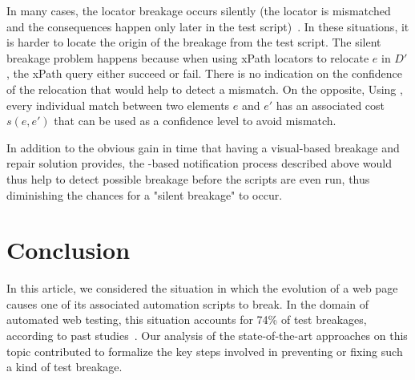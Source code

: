 In many cases, the locator breakage occurs silently (the locator is mismatched
and the consequences happen only later in the test
script)~\cite{stocco2018visual}. In these situations, it is harder to locate the
origin of the breakage from the test script. The silent breakage problem happens
because when using xPath locators to relocate $e$ in $D'$, the xPath query
either succeed or fail. There is no indication on the confidence of the
relocation that would help to detect a mismatch. On the opposite, Using
\erratum{}, every individual match between two elements $e$ and $e'$ has an
associated cost $s(e, e')$ that can be used as a confidence level to avoid
mismatch.

In addition to the obvious gain in time that having a visual-based breakage and
repair solution provides, the \erratum-based notification process described
above would thus help to detect possible breakage before the scripts are even
run, thus diminishing the chances for a "silent breakage" to occur.


\section{Conclusion}\label{sec:conclusion}
In this article, we considered the situation in which the evolution of a web page causes one of its associated automation scripts to break.
In the domain of automated web testing, this situation accounts for 74\% of test breakages, according to past studies~\cite{hammoudi2016record}.
% 
Our analysis of the state-of-the-art approaches on this topic contributed to formalize the key steps involved in preventing or fixing such a kind of test breakage.

